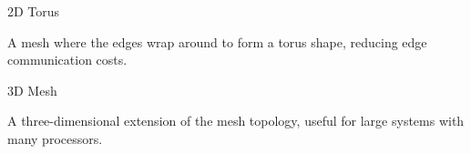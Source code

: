 \documentclass[a4paper, 10pt]{book}
\begin{document}
                    \vspace{0.3cm}
                    \noindent
                    \begin{minipage}{0.49\linewidth}
                        \begin{tcolorbox}[colframe=black!50, colback=white, size=small]
                            
                            {\bold 2D Torus}
                            
                            A mesh where the edges wrap around to form a torus shape, reducing edge communication costs.

                            \begin{center}
                                \begin{tikzpicture}

                                    
                                    
                                \end{tikzpicture}
                            \end{center}

                        \end{tcolorbox}
                    \end{minipage}
                    \hfill
                    \begin{minipage}{0.49\linewidth}
                        \begin{tcolorbox}[colframe=black!50, colback=white, size=small]
                            
                            {\bold 3D Mesh}
                            
                            A three-dimensional extension of the mesh topology, useful for large systems with many processors.

                            \begin{center}
                                \begin{tikzpicture}

                                    
                                    
                                \end{tikzpicture}
                            \end{center}

                        \end{tcolorbox}
                    \end{minipage}
                    
\end{document}
